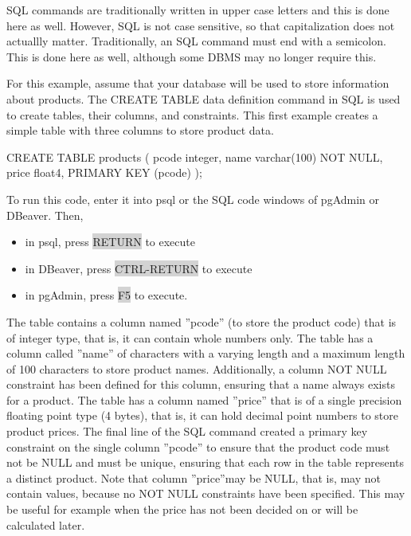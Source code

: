 \begin{infobox}
SQL commands are traditionally written in upper case letters and this is done here as well. However, SQL is not case sensitive, so that capitalization does not actuallly matter. Traditionally, an SQL command must end with a semicolon. This is done here as well, although some DBMS may no longer require this. 
\end{infobox}

For this example, assume that your database will be used to store information about products. The CREATE TABLE data definition command in SQL is used to create tables, their columns, and constraints. This first example creates a simple table with three columns to store product data.

\begin{sqlcode}
CREATE TABLE products (
  pcode integer,
  name  varchar(100) NOT NULL,
  price float4,
  PRIMARY KEY (pcode) 
);
\end{sqlcode}

\begin{withcode}
\begin{infobox}
To run this code, enter it into psql or the SQL code windows of pgAdmin or DBeaver. Then,
\begin{itemize}
   \item in psql, press \colorbox{lightgray}{RETURN} to execute
   \item in DBeaver, press \colorbox{lightgray}{CTRL-RETURN} to execute
   \item in pgAdmin, press \colorbox{lightgray}{F5} to execute.
\end{itemize}
\end{infobox}
\end{withcode}

The table contains a column named ''pcode'' (to store the product code) that is of integer type, that is, it can contain whole numbers only. The table has a column called ''name'' of characters with a varying length and a maximum length of 100 characters to store product names. Additionally, a column NOT NULL constraint has been defined for this column, ensuring that a name always exists for a product. The table has a column named ''price'' that is of a single precision floating point type (4 bytes), that is, it can hold decimal point numbers to store product prices. The final line of the SQL command created a primary key constraint on the single column ''pcode'' to ensure that the product code must not be NULL and must be unique, ensuring that each row in the table represents a distinct product. Note that column ''price''may be NULL, that is, may not contain values, because no NOT NULL constraints have been specified. This may be useful for example when the price has not been decided on or will be calculated later.

